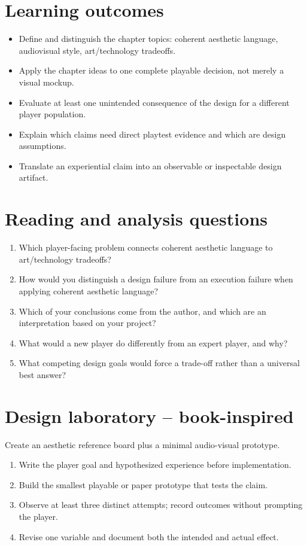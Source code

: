 \documentclass[11pt]{article}
\begin{document}
\section{Learning outcomes}
\begin{itemize}
\item Define and distinguish the chapter topics: coherent aesthetic language, audiovisual style, art/technology tradeoffs.
\item Apply the chapter ideas to one complete playable decision, not merely a visual mockup.
\item Evaluate at least one unintended consequence of the design for a different player population.
\item Explain which claims need direct playtest evidence and which are design assumptions.
\item Translate an experiential claim into an observable or inspectable design artifact.
\end{itemize}

\section{Reading and analysis questions}
\begin{enumerate}
\item Which player-facing problem connects coherent aesthetic language to art/technology tradeoffs?
\item How would you distinguish a design failure from an execution failure when applying coherent aesthetic language?
\item Which of your conclusions come from the author, and which are an interpretation based on your project?
\item What would a new player do differently from an expert player, and why?
\item What competing design goals would force a trade-off rather than a universal best answer?
\end{enumerate}

\section{Design laboratory -- book-inspired}
Create an aesthetic reference board plus a minimal audio-visual prototype.

\begin{enumerate}
\item Write the player goal and hypothesized experience before implementation.
\item Build the smallest playable or paper prototype that tests the claim.
\item Observe at least three distinct attempts; record outcomes without prompting the player.
\item Revise one variable and document both the intended and actual effect.
\end{enumerate}
\end{document}
